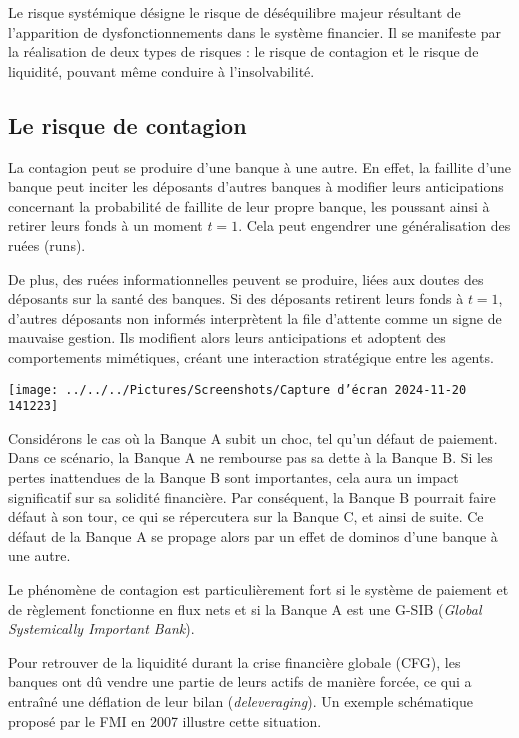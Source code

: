 \documentclass[a4paper, 12pt]{report}
\begin{document}
Le risque systémique désigne le risque de déséquilibre majeur résultant de l'apparition de dysfonctionnements dans le système financier. Il se manifeste par la réalisation de deux types de risques : le risque de contagion et le risque de liquidité, pouvant même conduire à l'insolvabilité.

\subsection{Le risque de contagion}

La contagion peut se produire d'une banque à une autre. En effet, la faillite d'une banque peut inciter les déposants d'autres banques à modifier leurs anticipations concernant la probabilité de faillite de leur propre banque, les poussant ainsi à retirer leurs fonds à un moment \(t=1\). Cela peut engendrer une généralisation des ruées (runs). 

De plus, des ruées informationnelles peuvent se produire, liées aux doutes des déposants sur la santé des banques. Si des déposants retirent leurs fonds à \(t=1\), d'autres déposants non informés interprètent la file d'attente comme un signe de mauvaise gestion. Ils modifient alors leurs anticipations et adoptent des comportements mimétiques, créant une interaction stratégique entre les agents.

\begin{center}
	\texttt{[image: ../../../Pictures/Screenshots/Capture d'écran 2024-11-20 141223]}
\end{center}

Considérons le cas où la Banque A subit un choc, tel qu'un défaut de paiement. Dans ce scénario, la Banque A ne rembourse pas sa dette à la Banque B. Si les pertes inattendues de la Banque B sont importantes, cela aura un impact significatif sur sa solidité financière. Par conséquent, la Banque B pourrait faire défaut à son tour, ce qui se répercutera sur la Banque C, et ainsi de suite. Ce défaut de la Banque A se propage alors par un effet de dominos d'une banque à une autre.

Le phénomène de contagion est particulièrement fort si le système de paiement et de règlement fonctionne en flux nets et si la Banque A est une G-SIB (\textit{Global Systemically Important Bank}).

Pour retrouver de la liquidité durant la crise financière globale (CFG), les banques ont dû vendre une partie de leurs actifs de manière forcée, ce qui a entraîné une déflation de leur bilan (\textit{deleveraging}). Un exemple schématique proposé par le FMI en 2007 illustre cette situation.
\end{document}
